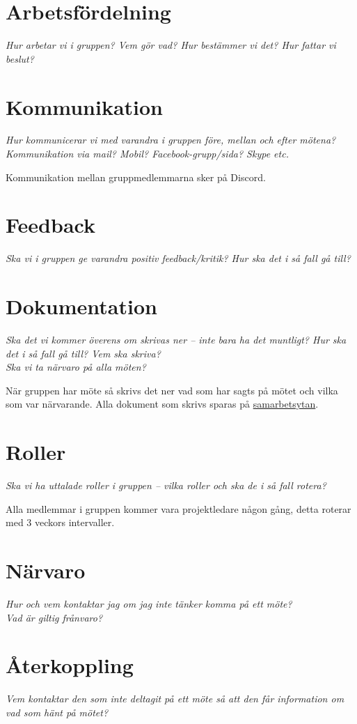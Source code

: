 \section*{Arbetsfördelning}
\textit{Hur arbetar vi i gruppen? Vem gör vad? Hur bestämmer vi det? Hur fattar vi beslut?}

\section*{Kommunikation}
\textit{Hur kommunicerar vi med varandra i gruppen före, mellan och efter mötena? Kommunikation via mail? Mobil? Facebook-grupp/sida? Skype etc.}

Kommunikation mellan gruppmedlemmarna sker på Discord.

\section*{Feedback}
\textit{Ska vi i gruppen ge varandra positiv feedback/kritik? Hur ska det i så fall gå till?}

\section*{Dokumentation}
\textit{Ska det vi kommer överens om skrivas ner – inte bara ha det muntligt? Hur ska det i så fall gå till? Vem ska skriva? \\
Ska vi ta närvaro på alla möten?}

När gruppen har möte så skrivs det ner vad som har sagts på mötet och vilka som var närvarande. Alla dokument som skrivs sparas på \href{https://github.com/anhility/DVA227}{samarbetsytan}.

\section*{Roller}
\textit{Ska vi ha uttalade roller i gruppen – vilka roller och ska de i så fall rotera?}

Alla medlemmar i gruppen kommer vara projektledare någon gång, detta roterar med 3 veckors intervaller.

\section*{Närvaro}
\textit{Hur och vem kontaktar jag om jag inte tänker komma på ett möte? \\
Vad är giltig frånvaro?}

\section*{Återkoppling}
\textit{Vem kontaktar den som inte deltagit på ett möte så att den får information om vad som hänt på mötet?}

